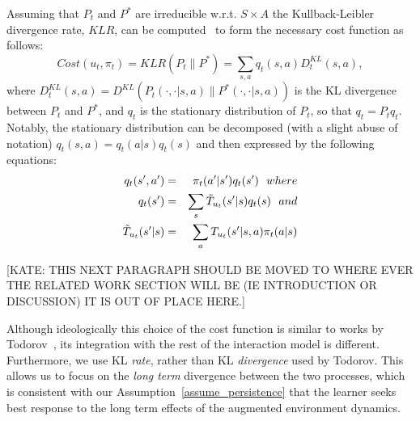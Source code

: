 \documentclass[letterpaper]{aamas2010}
\begin{document}
 Assuming that
$P_t$ and $P^*$ are irreducible w.r.t. $S\times A$ the
Kullback-Leibler divergence rate, $KLR$, can be
computed~\cite{rached_alajaji_campbell_2004} to form the necessary
cost function as follows:
$$
Cost(u_t,\pi_t)=KLR(P_t\|P^*)=\sum\limits_{s,a}q_t(s,a)D^{KL}_t(s,a),$$
where
$D^{KL}_t(s,a)=D^{KL}(P_t(\cdot,\cdot|s,a)\|P^*(\cdot,\cdot|s,a))$ is the KL divergence between 
$P_t$ and $P^*$,
and
$q_t$ is the stationary distribution of $P_t$, so that
$q_t=P_tq_t$. Notably, the stationary distribution can be decomposed
(with a slight abuse of notation) $q_t(s,a)=q_t(a|s)q_t(s)$ and then
expressed by the following equations:
\begin{eqnarray*}
q_t(s',a')&=&\pi_t(a'|s')q_t(s')\ \ \displaystyle{where}\\
q_t(s')&=&\sum\limits_s\Tilde{T}_{u_t}(s'|s)q_t(s) \ \ \displaystyle{and}\\
\Tilde{T}_{u_t}(s'|s)&=&\sum_{a}T_{u_t}(s'|s,a)\pi_t(a|s)
\end{eqnarray*}

[KATE: THIS NEXT PARAGRAPH SHOULD BE MOVED TO WHERE EVER THE RELATED WORK SECTION WILL BE (IE INTRODUCTION OR DISCUSSION) IT IS OUT OF PLACE HERE.]


Although ideologically this choice of the cost function is similar to
works by
Todorov~\cite{todorov_2009_framework,todorov_2009_framework_sup}, its
integration with the rest of the interaction model is
different. Furthermore, we use KL {\em rate}, rather than KL {\em
  divergence} used by Todorov. This allows us to focus on the {\em
  long term} divergence between the two processes, which is consistent
with our Assumption~\ref{assume_persistence} that the learner seeks
best response to the long term effects of the augmented environment
dynamics.
\end{document}
